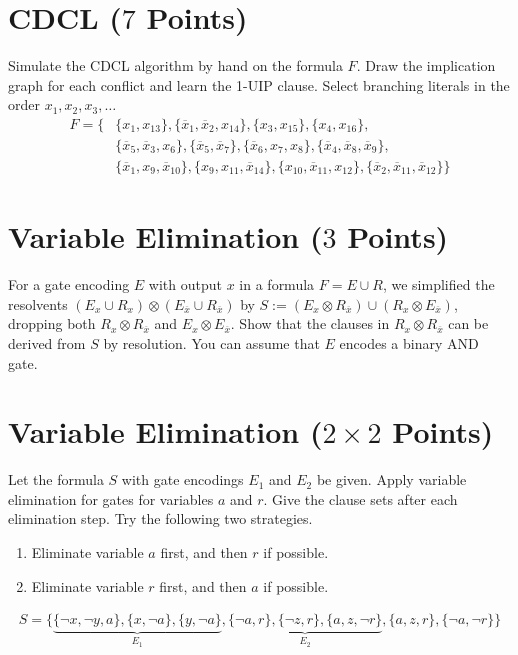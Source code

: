 \documentclass{article}
\begin{document}

\section{CDCL ($7$ Points)}
Simulate the CDCL algorithm by hand on the formula $F$.
Draw the implication graph for each conflict and learn the 1-UIP clause.
Select branching literals in the order $x_1, x_2, x_3, \dots$
\vspace*{-1em}
\begin{align*}
F = \bigl\{ &\{ x_1, x_{13} \}, \{ \overline x_1, \overline x_2, x_{14} \}, \{ x_3, x_{15} \}, \{ x_4, x_{16} \}, \\
            &\{ \overline x_5, \overline x_3, x_6 \}, \{ \overline x_5, \overline x_7 \}, \{ \overline x_6, x_7, x_8 \}, \{ \overline x_4, \overline x_8, \overline x_9 \}, \\
            &\{ \overline x_1, x_9, \overline x_{10} \}, \{ x_9, x_{11}, \overline x_{14} \}, \{ x_{10}, \overline x_{11}, x_{12} \}, \{ \overline x_2, \overline x_{11}, \overline x_{12} \} \bigr\}
\end{align*}

\section{Variable Elimination ($3$ Points)}
For a gate encoding $E$ with output $x$ in a formula $F = E \cup R$,
we simplified the resolvents $(E_x \cup R_x) \otimes (E_{\overline x} \cup R_{\overline x})$ by
$S := (E_x \otimes R_{\overline x}) \cup (R_x \otimes E_{\overline x})$, dropping both
$R_x \otimes R_{\overline x}$ and $E_x \otimes E_{\overline x}$.
Show that the clauses in $R_x \otimes R_{\overline x}$ can be derived from $S$ by resolution.
You can assume that $E$ encodes a binary AND gate.

\section{Variable Elimination ($2 \times 2$ Points)}
Let the formula $S$ with gate encodings $E_1$ and $E_2$ be given.
Apply variable elimination for gates for variables $a$ and $r$.
Give the clause sets after each elimination step.
Try the following two strategies.
\vspace*{-1ex}
\begin{enumerate}\setlength{\itemsep}{0pt}
\item Eliminate variable $a$ first, and then $r$ if possible.
\item Eliminate variable $r$ first, and then $a$ if possible.
\end{enumerate}
\vspace*{-1em}
\begin{align*}
S = \bigl\{ \underbrace{\{ \lnot x, \lnot y, a \}, \{ x, \lnot a \}, \{ y, \lnot a \}}_{E_1},
\underbrace{\{ \lnot a, r \}, \{ \lnot z, r \}, \{ a, z, \lnot r \}}_{E_2}, \{ a, z, r \},
\{ \lnot a, \lnot r \} \bigr\}
\end{align*}
\end{document}
